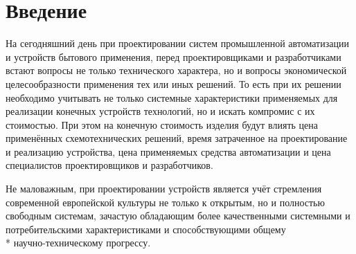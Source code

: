 \section*{Введение}
\begin{par}
На сегодняшний день при проектировании систем промышленной автоматизации и устройств
бытового применения, перед проектировщиками и разработчиками встают вопросы не только технического
характера, но и вопросы экономической целесообразности применения тех или иных решений.
То есть при их решении необходимо учитывать не только системные характеристики применяемых для
реализации конечных устройств технологий, но и искать компромис с их стоимостью. При этом
на конечную стоимость изделия будут влиять цена применённых схемотехнических решений,
время затраченное на проектирование и реализацию устройства, цена применяемых средства автоматизации
и цена специалистов проектировщиков и разработчиков.
\end{par}

\begin{par}
Не маловажным, при проектировании устройств является учёт стремления
современной европейской культуры не только к открытым, но и полностью свободным системам,
зачастую обладающим более качественными системными и
потребительскими характеристиками и способствующими общему\\*
научно-техническому прогрессу\cite{lessing}.
\end{par}
\newpage{}

